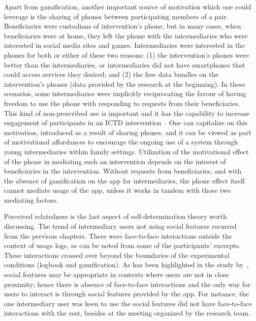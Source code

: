 Apart from gamification, another important source of motivation which one could leverage is the sharing of phones between participating members of a pair. Beneficiaries were custodians of intervention's phone, but in many cases, when beneficiaries were at home, they left the phone with the intermediaries who were interested in social media sites and games. Intermediaries were interested in the phones for both or either of these two reasons: (1) the intervention's phones were better than the intermediaries, or intermediaries did not have smartphones that could access services they desired; and (2) the free data bundles on the intervention's phones (data provided by the research at the beginning). In these scenarios, some intermediaries were implicitly reciprocating the favour of having freedom to use the phone with responding to requests from their beneficiaries. This kind of non-prescribed use is important and it has the capability to increase engagement of participants in an ICTD intervention~\citep{ferrplay2015}. One can capitalize on this motivation, introduced as a result of sharing phones, and it can be viewed as part of motivational affordances to encourage the ongoing use of a system through young intermediaries within family settings. Utilization of the motivational effect of the phone in mediating such an intervention depends on the interest of beneficiaries in the intervention. Without requests from beneficiaries, and with the absence of gamification on the app for intermediaries, the phone effect itself cannot mediate usage of the app, unless it works in tandem with those two mediating factors.

Perceived relatedness is the last aspect of self-determination theory worth discussing. The trend of intermediary users not using social features recurred from the previous chapters. There were face-to-face interactions outside the context of usage logs, as can be noted from some of the participants' excerpts. These interactions crossed over beyond the boundaries of the experimental conditions (logbook and gamification). As has been highlighted in the study by~\cite{lin2006:fish}, social features may be appropriate in contexts where users are not in close proximity; hence there is absence of face-to-face interactions and the only way for users to interact is through social features provided by the app. For instance, the one intermediary user was keen to use the social features did not have face-to-face interactions with the rest, besides at the meeting organized by the research team. 
